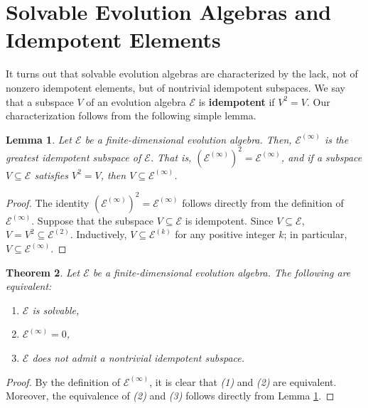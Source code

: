 \documentclass[11pt]{article}
\newtheorem{thm}{Theorem}[section]
\newtheorem{lem}[thm]{Lemma}
\theoremstyle{definition}
\numberwithin{equation}{section}
\begin{document}
\section{Solvable Evolution Algebras and Idempotent Elements}


\begin{aiblock}


It turns out that solvable evolution algebras are characterized by the lack, not of nonzero idempotent elements, but of nontrivial idempotent subspaces. We say that a subspace $V$ of an evolution algebra $\mathcal E$ is \textbf{idempotent} if $V^2=V$. Our characterization follows from the following simple lemma. 


\begin{lem}\label{einftyisidempotent}
Let $\mathcal E$ be a finite-dimensional evolution algebra. Then, $\mathcal E^{(\infty)}$ is the greatest idempotent subspace of $\mathcal E$. That is, $\left(\mathcal E^{(\infty)}\right)^2 = \mathcal E^{(\infty)}$, and if a subspace $V\subseteq \mathcal E$ satisfies $V^2 = V$, then $V\subseteq \mathcal E^{(\infty)}$. 

\end{lem}
\begin{proof}
    The identity $\left(\mathcal E^{(\infty)}\right)^2 = \mathcal E^{(\infty)}$ follows directly from the definition of $\mathcal E^{(\infty)}$. Suppose that the subspace $V\subseteq \mathcal E$ is idempotent. Since $V\subseteq \mathcal E$, $V = V^2 \subseteq \mathcal E^{(2)}$. Inductively, $V\subseteq \mathcal E^{(k)}$ for any positive integer $k$; in particular, $V\subseteq \mathcal E^{(\infty)}$. 
\end{proof}

\begin{thm}\label{solvableiff}
Let $\mathcal E$ be a finite-dimensional evolution algebra. The following are equivalent: 

\begin{enumerate}
        \item $\mathcal E$ is solvable,
        \item $\mathcal E^{(\infty)} = 0$,
        \item $\mathcal E$ does not admit a nontrivial idempotent subspace.
\end{enumerate}
\end{thm}
\begin{proof}
    By the definition of $\mathcal E^{(\infty)}$, it is clear that \textit{(1)} and \textit{(2)} are equivalent. Moreover, the equivalence of \textit{(2)} and \textit{(3)} follows directly from Lemma \ref{einftyisidempotent}.
\end{proof}



\end{aiblock}
\end{document}
